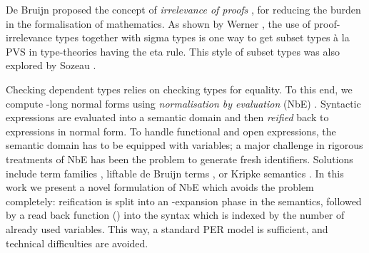 \documentclass{LMCS}
\newcommand{\LONGVERSION}[1]{}
\begin{document}
De Bruijn proposed the concept of \emph{irrelevance of proofs} \cite{aut-4},
for reducing the burden in the formalisation of mathematics.  As shown
by Werner \cite{werner:strengthProofIrrelevance}, the use of
proof-irrelevance types together with sigma types is one way to get
subset types \`a la PVS \cite{pvs-sub} in type-theories having the
eta rule.  This style of subset types was also explored by Sozeau
\cite[Sec.~3.3]{sozeau:types06}\LONGVERSION{; for another presentation of subset types in
  Martin-L\"{o}f type-theory see \cite{sambin}}.
\LONGVERSION{Berardi conjectured that
  (impredicative) type-theory with proof-irrelevance is equivalent to
  constructive mathematics \cite{berardi}.}

































Checking dependent types relies on checking types for equality.  To
this end, we compute -long normal forms using
\emph{normalisation by evaluation} (NbE) \cite{martinlof:jaist04}.  
Syntactic expressions are evaluated into a semantic domain and then
\emph{reified} back to expressions in normal form.
To handle functional and
open expressions, the semantic domain has to be equipped
with variables; a major challenge in rigorous treatments of NbE has
been the problem to generate fresh identifiers.
Solutions include term families \cite{bergerSchwichtenberg:lics91},
liftable de Bruijn terms \cite{aehlig:nbe}, or Kripke semantics
\cite{abelCoquandDybjer:mpc08}.  In this work we present a novel
formulation of NbE which avoids the problem completely: reification is
split into an -expansion phase  in the semantics,
followed by a read back function ()
into the syntax which is indexed by
the number of already used variables.  This way, a standard PER
model is sufficient, and technical difficulties are avoided.
\end{document}
